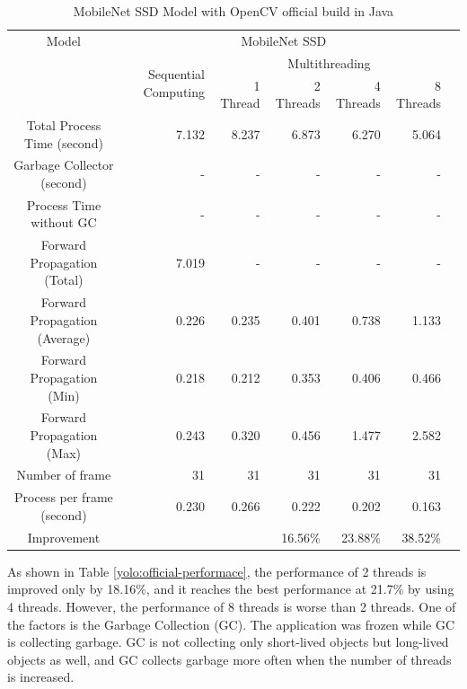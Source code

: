             \begin{table}[!htp]\centering
                \scriptsize
                \begin{tabular}{lrrrrrrr}\toprule
                    \multicolumn{2}{c}{Model} &\multicolumn{5}{c}{MobileNet SSD} \\\cmidrule{1-7}
                    \multicolumn{2}{c}{\multirow{2}{*}{}} &\multirow{2}{*}{Sequential Computing} &\multicolumn{4}{c}{Multithreading} \\\cmidrule{4-7}
                    & & &1 Thread &2 Threads &4 Threads &8 Threads \\\midrule
                    \multicolumn{2}{c}{Total Process Time (second)} &7.132 &8.237 &6.873 &6.270 &5.064 \\
                    \multicolumn{2}{c}{Garbage Collector (second)} &- &- &- &- &- \\
                    \multicolumn{2}{c}{Process Time without GC} &- &- &- &- &- \\
                    \multicolumn{2}{c}{Forward Propagation (Total)} &7.019 &- &- &- &- \\
                    \multicolumn{2}{c}{Forward Propagation (Average)} &0.226 &0.235 &0.401 &0.738 &1.133 \\
                    \multicolumn{2}{c}{Forward Propagation (Min)} &0.218 &0.212 &0.353 &0.406 &0.466 \\
                    \multicolumn{2}{c}{Forward Propagation (Max)} &0.243 &0.320 &0.456 &1.477 &2.582 \\
                    \multicolumn{2}{c}{Number of frame} &31 &31 &31 &31 &31 \\
                    \multicolumn{2}{c}{Process per frame (second)} &0.230 &0.266 &0.222 &0.202 &0.163 \\
                    \multicolumn{2}{c}{Improvement} & & &16.56\% &23.88\% &38.52\% \\
                    \bottomrule
                \end{tabular}

                \caption{MobileNet SSD Model with OpenCV official build in Java}\label{ssd:official-performace}
            \end{table}

            As shown in Table \ref{yolo:official-performace},
                the performance of 2 threads is improved only by 18.16\%,
                and it reaches the best performance at 21.7\% by using 4 threads.
            However, the performance of 8 threads is worse than 2 threads.
                One of the factors is the Garbage Collection (GC).
                The application was frozen while GC is collecting garbage.
            GC is not collecting only short-lived objects but long-lived objects as well,
                and GC collects garbage more often when the number of threads is increased.

